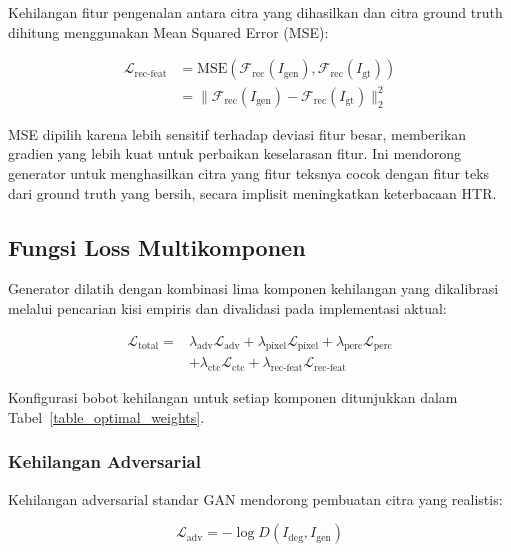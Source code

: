 \documentclass[journal]{IEEEtran}
\begin{document}
Kehilangan fitur pengenalan antara citra yang dihasilkan dan citra ground truth dihitung menggunakan Mean Squared Error (MSE):

\begin{equation}
\begin{split}
\mathcal{L}_{\text{rec-feat}} &= \text{MSE}(\mathcal{F}_{\text{rec}}(I_{\text{gen}}), \mathcal{F}_{\text{rec}}(I_{\text{gt}})) \\
&= \|\mathcal{F}_{\text{rec}}(I_{\text{gen}}) - \mathcal{F}_{\text{rec}}(I_{\text{gt}})\|_2^2
\end{split}
\end{equation}

MSE dipilih karena lebih sensitif terhadap deviasi fitur besar, memberikan gradien yang lebih kuat untuk perbaikan keselarasan fitur. Ini mendorong generator untuk menghasilkan citra yang fitur teksnya cocok dengan fitur teks dari ground truth yang bersih, secara implisit meningkatkan keterbacaan HTR.

\subsection{Fungsi Loss Multikomponen}

Generator dilatih dengan kombinasi lima komponen kehilangan yang dikalibrasi melalui pencarian kisi empiris dan divalidasi pada implementasi aktual:

\begin{equation}
\begin{split}
\mathcal{L}_{\text{total}} = &\lambda_{\text{adv}}\mathcal{L}_{\text{adv}} + \lambda_{\text{pixel}}\mathcal{L}_{\text{pixel}} + \lambda_{\text{perc}}\mathcal{L}_{\text{perc}} \\
&+ \lambda_{\text{ctc}}\mathcal{L}_{\text{ctc}} + \lambda_{\text{rec-feat}}\mathcal{L}_{\text{rec-feat}}
\end{split}
\end{equation}

Konfigurasi bobot kehilangan untuk setiap komponen ditunjukkan dalam Tabel~\ref{table_optimal_weights}.

\subsubsection{Kehilangan Adversarial}

Kehilangan adversarial standar GAN mendorong pembuatan citra yang realistis:

\begin{equation}
\mathcal{L}_{\text{adv}} = -\log D(I_{\text{deg}}, I_{\text{gen}})
\end{equation}
\end{document}
